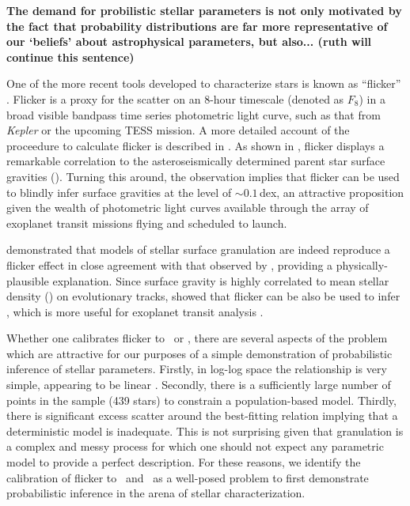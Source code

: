 \textbf{
The demand for probilistic stellar parameters is not only motivated by the fact
that probability distributions are far more representative of our `beliefs'
about astrophysical parameters, but also... (ruth will continue this sentence)
}



One of the more recent tools developed to characterize stars is known as
``flicker'' \citep{bastien:2013}. Flicker is a proxy for the scatter on an
8-hour timescale (denoted as $F_8$) in a broad visible bandpass time series
photometric light curve, such as that from \textit{Kepler} or the upcoming TESS
mission. A more detailed account of the proceedure to calculate flicker is
described in \citet{bastien:2013}. As shown in \citet{bastien:2013}, flicker
displays a remarkable correlation to the asteroseismically determined parent
star surface gravities (\logg). Turning this around, the observation implies
that flicker can be used to blindly infer surface gravities at the level of
$\sim0.1$\,dex, an attractive proposition given the wealth of photometric light
curves available through the array of exoplanet transit missions flying and
scheduled to launch.

\citet{cranmer:2014} demonstrated that models of stellar surface granulation are 
indeed reproduce a flicker effect in close agreement with that observed by
\citet{bastien:2013}, providing a physically-plausible explanation. Since
surface gravity is highly correlated to mean stellar density (\rhostar) on
evolutionary tracks, \citet{kipping:2014} showed that flicker can be also
be used to infer \rhostar, which is more useful for exoplanet transit
analysis \citep{seager:2003}.

Whether one calibrates flicker to \logg\ or \rhostar, there are several aspects
of the problem which are attractive for our purposes of a simple demonstration
of probabilistic inference of stellar parameters. Firstly, in log-log space the
relationship is very simple, appearing to be linear \citep{kipping:2014}. 
Secondly, there is a sufficiently large number of points in the sample (439 
stars) to constrain a population-based model. Thirdly, there is significant 
excess scatter around the best-fitting relation implying that a deterministic 
model is inadequate. This is not surprising given that granulation is a complex 
and messy process for which one should not expect any parametric model to 
provide a perfect description. For these reasons, we identify the calibration of 
flicker to \logg\ and \rhostar\ as a well-posed problem to first demonstrate 
probabilistic inference in the arena of stellar characterization.
